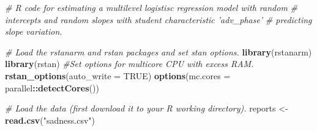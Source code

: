 \documentclass[doc]{apa6}
\newenvironment{Shaded}{\begin{snugshade}}{\end{snugshade}}
\newcommand{\KeywordTok}[1]{\textcolor[rgb]{0.13,0.29,0.53}{\textbf{#1}}}
\newcommand{\DataTypeTok}[1]{\textcolor[rgb]{0.13,0.29,0.53}{#1}}
\newcommand{\StringTok}[1]{\textcolor[rgb]{0.31,0.60,0.02}{#1}}
\newcommand{\CommentTok}[1]{\textcolor[rgb]{0.56,0.35,0.01}{\textit{#1}}}
\newcommand{\OtherTok}[1]{\textcolor[rgb]{0.56,0.35,0.01}{#1}}
\newcommand{\OperatorTok}[1]{\textcolor[rgb]{0.81,0.36,0.00}{\textbf{#1}}}
\newcommand{\NormalTok}[1]{#1}
\begin{document}
\begin{Shaded}
\begin{Highlighting}[]
\CommentTok{# R code for estimating a multilevel logistisc regression model with random}
\CommentTok{# intercepts and random slopes with student characteristic 'adv_phase'}
\CommentTok{# predicting slope variation.}

\CommentTok{# Load the rstanarm and rstan packages and set stan options.}
\KeywordTok{library}\NormalTok{(rstanarm)}
\KeywordTok{library}\NormalTok{(rstan)}
\CommentTok{#Set options for multicore CPU with excess RAM.}
\KeywordTok{rstan_options}\NormalTok{(}\DataTypeTok{auto_write =} \OtherTok{TRUE}\NormalTok{)}
\KeywordTok{options}\NormalTok{(}\DataTypeTok{mc.cores =}\NormalTok{ parallel}\OperatorTok{::}\KeywordTok{detectCores}\NormalTok{())}

\CommentTok{# Load the data (first download it to your R working directory).}
\NormalTok{reports <-}\StringTok{ }\KeywordTok{read.csv}\NormalTok{(}\StringTok{"sadness.csv"}\NormalTok{)}


\end{Highlighting}
\end{Shaded}
\end{document}
